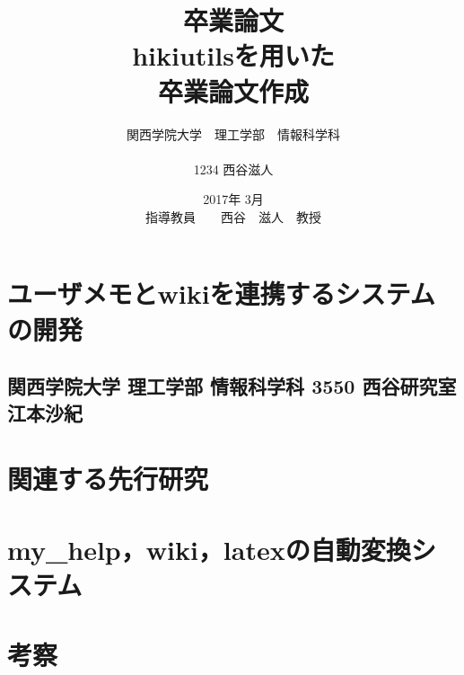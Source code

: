 \documentclass[12pt,a4paper]{jsarticle}
\begin{document}
\title{卒業論文\\
\vspace{4cm} hikiutilsを用いた\\卒業論文作成}
\author{ 関西学院大学　理工学部　情報科学科\\\\1234 西谷滋人}
\date{\vspace{3cm} 2017年  3月\\
\vspace{3cm} 指導教員　　西谷　滋人　教授}
\maketitle
\setcounter{tocdepth}{6}
\tableofcontents

\tableofcontents
\section{ユーザメモとwikiを連携するシステムの開発}
\subsection{関西学院大学 理工学部 情報科学科 3550 西谷研究室 江本沙紀}

\section{関連する先行研究}





\section{my\_help，wiki，latexの自動変換システム}


\section{考察}



\end{document}
